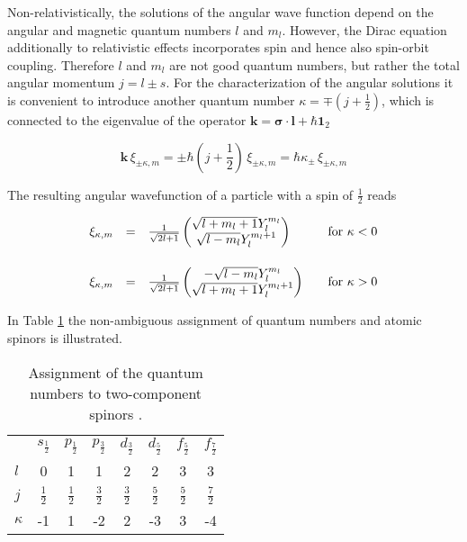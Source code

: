Non-relativistically, the solutions
of the angular wave function depend on the angular and magnetic quantum numbers
$l$ and $m_l$. However, the Dirac equation additionally to relativistic effects
incorporates spin and hence also spin-orbit coupling. Therefore $l$ and $m_l$ are
not good quantum numbers, but rather the total angular momentum $j=l\pm s$.
For the characterization of the angular solutions it is convenient
to introduce another quantum number $\kappa=\mp(j+\frac12)$, which is connected
to the eigenvalue of the operator
$\mathbf{k}= \boldsymbol{\sigma}\cdot \mathbf{l} + \hbar \mathbf{1}_2$

\begin{equation}
 \mathbf{k} \, \xi_{\pm \kappa,m} = \pm \hbar (j+\frac12) \, \xi_{\pm \kappa,m}
 = \hbar \kappa_\pm \, \xi_{\pm \kappa,m}
\end{equation}


The resulting angular wavefunction of a particle with a spin of $\frac12$ reads

\begin{equation}\begin{array}{rcll}
\xi_{\kappa,m} &=& \frac1{\sqrt{2l+1}}\begin{pmatrix}\sqrt{l+m_l+1}Y_l^{m_l}\\\sqrt{l-m_l}Y_l^{m_l+1}\end{pmatrix} &\quad\text{for }\kappa<0\\\vphantom{\rule{0pt}{30pt}}
\xi_{\kappa,m} &=& \frac1{\sqrt{2l+1}}\begin{pmatrix}-\sqrt{l-m_l}Y_l^{m_l}\\\sqrt{l+m_l+1}Y_l^{m_l+1}\end{pmatrix} &\quad\text{for }\kappa>0\\
\end{array}\end{equation}

In Table \ref{qzspinor} the non-ambiguous assignment of quantum numbers and atomic
spinors is illustrated.

\begin{table}[h]
\centering
\begin{tabular}{lccccccc}
\toprule
        & $s_{\frac12}$ & $p_{\frac12}$ & $p_{\frac32}$ & $d_{\frac32}$ & $d_{\frac52}$ & $f_{\frac52}$ & $f_{\frac72}$\\\vphantom{\rule{0pt}{20pt}}
$l$     & 0            & 1           & 1            & 2            & 2            & 3            & 3\\\vphantom{\rule{0pt}{20pt}}
$j$     & $\frac12$    & $\frac12$   & $\frac32$    & $\frac32$    & $\frac52$    & $\frac52$    & $\frac72$\\\vphantom{\rule{0pt}{20pt}}
$\kappa$& -1           & 1           & -2           & 2            & -3           & 3            & -4\\
\bottomrule
\end{tabular}
\caption{Assignment of the quantum numbers to two-component spinors \cite{dyallfaegri}.}
\label{qzspinor}
\end{table}

